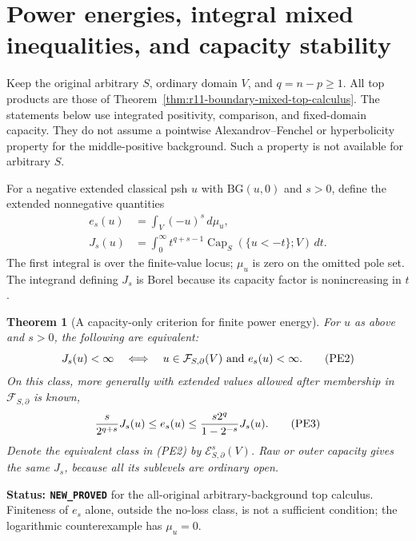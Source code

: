 \documentclass[11pt,a4paper]{article}
\numberwithin{equation}{section}
\newtheorem{theorem}{Theorem}[section]
\theoremstyle{definition}
\theoremstyle{remark}
\begin{document}


\section{Power energies, integral mixed inequalities, and capacity stability}
\label{sec:r11-power-energy-stability}

Keep the original arbitrary $S$, ordinary domain $V$, and $q=n-p\geq1$.
All top products are those of
Theorem~\ref{thm:r11-boundary-mixed-top-calculus}. The statements
below use integrated positivity, comparison, and fixed-domain
capacity. They do not assume a pointwise Alexandrov--Fenchel or
hyperbolicity property for the middle-positive background. Such a
property is not available for arbitrary $S$.

For a negative extended classical psh $u$ with $\mathrm{BG}(u,0)$
and $s>0$, define the extended nonnegative quantities
\[
 \begin{split}
 e_s(u)&=\int_V(-u)^s\,d\mu_u,\\
 J_s(u)&=\int_0^\infty t^{q+s-1}
                       \operatorname{Cap}_S(\{u<-t\};V)\,dt.
 \end{split}
 \tag{PE1}
\]
The first integral is over the finite-value locus; $\mu_u$ is zero
on the omitted pole set. The integrand defining $J_s$ is Borel
because its capacity factor is nonincreasing in $t$.

\begin{theorem}[A capacity-only criterion for finite power energy]
\label{thm:r11-power-energy-capacity-equivalence}
For $u$ as above and $s>0$, the following are equivalent:
\[
 J_s(u)<\infty
 \quad\Longleftrightarrow\quad
 u\in\mathcal F_{S,\partial}(V)\ \hbox{and}\ e_s(u)<\infty.
 \tag{PE2}
\]
On this class, more generally with extended values allowed after
membership in $\mathcal F_{S,\partial}$ is known,
\[
 {s\over2^{q+s}}J_s(u)
       \leq e_s(u)
       \leq {s2^q\over1-2^{-s}}J_s(u).
 \tag{PE3}
\]
Denote the equivalent class in (PE2) by
$\mathcal E^s_{S,\partial}(V)$. Raw or outer capacity gives the
same $J_s$, because all its sublevels are ordinary open.
\end{theorem}

\noindent\textbf{Status: \texttt{NEW\_PROVED}} for the
all-original arbitrary-background top calculus. Finiteness of
$e_s$ alone, outside the no-loss class, is not a sufficient
condition; the logarithmic counterexample has $\mu_u=0$.
\end{document}
